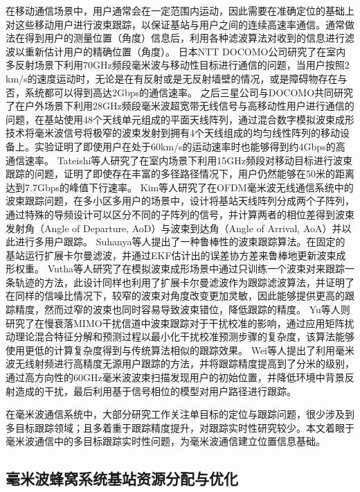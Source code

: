 在移动通信场景中，用户通常会在一定范围内运动，因此需要在准确定位的基础上对这些移动用户进行波束跟踪，以保证基站与用户之间的连续高速率通信。通常做法在得到用户的测量位置（角度）信息后，利用各种滤波算法对收到的信息进行滤波以重新估计用户的精确位置（角度）。
日本NTT DOCOMO公司研究了在室内多反射场景下利用70GHz频段毫米波与移动性目标进行通信的问题\cite{inoue2015experimental}，当用户按照$2$km/s的速度运动时，无论是在有反射或是无反射墙壁的情况，或是障碍物存在与否，系统都可以得到高达2Gbps的通信速率。
之后三星公司与DOCOMO共同研究了在户外场景下利用28GHz频段毫米波超宽带无线信号与高移动性用户进行通信的问题\cite{obara2016experiment}，在基站使用48个天线单元组成的平面天线阵列，通过混合数字模拟波束成形技术将毫米波信号将极窄的波束发射到拥有4个天线组成的均匀线性阵列的移动设备上。实验证明了即使用户在处于$60$km/s的运动速率时也能够得到约4Gbps的高通信速率。
Tateishi等人研究了在室内场景下利用15GHz频段对移动目标进行波束跟踪的问题\cite{tateishi2016indoor}，证明了即使存在丰富的多径路径情况下，用户仍然能够在50米的距离达到7.7Gbps的峰值下行速率。
Kim等人研究了在OFDM毫米波无线通信系统中的波束跟踪问题\cite{kim2018beam}，在多小区多用户的场景中，设计将基站天线阵列分成两个子阵列，通过特殊的导频设计可以区分不同的子阵列的信号，并计算两者的相位差得到波束发射角（Angle of Departure, AoD）与波束到达角（Angle of Arrival, AoA）并以此进行多用户跟踪。
Suhanya等人提出了一种鲁棒性的波束跟踪算法\cite{jayaprakasam2017robust}。在固定的基站运行扩展卡尔曼滤波，并通过EKF估计出的误差协方差来鲁棒地更新波束成形权重。
Vutha等人研究了在模拟波束成形场景中通过只训练一个波束对来跟踪一条轨迹的方法\cite{va2016beam}，此设计同样也利用了扩展卡尔曼滤波作为跟踪滤波算法，并证明了在同样的信噪比情况下，较窄的波束对角度改变更加灵敏，因此能够提供更高的跟踪精度，然而过窄的波束也同时容易导致波束错位，降低跟踪的精度。
Yu等人则研究了在慢衰落MIMO干扰信道中波束跟踪对于干扰校准的影响\cite{yu2012beam}，通过应用矩阵扰动理论混合特征分解和预测过程以最小化干扰校准预测步骤的复杂度，该算法能够使用更低的计算复杂度得到与传统算法相似的跟踪效果。
Wei等人提出了利用毫米波无线射频进行高精度无源用户跟踪的方法\cite{wei2015mtrack}，并将跟踪精度提高到了分米的级别，通过高方向性的60GHz毫米波波束扫描发现用户的初始位置，并降低环境中背景反射造成的干扰，最后利用基于信号相位的模型对用户路径进行跟踪。

在毫米波通信系统中，大部分研究工作关注单目标的定位与跟踪问题，很少涉及到多目标跟踪领域；且多着重于跟踪精度提升，对跟踪实时性研究较少。本文着眼于毫米波通信中的多目标跟踪实时性问题，为毫米波通信建立位置信息基础。

\subsection{毫米波蜂窝系统基站资源分配与优化}

